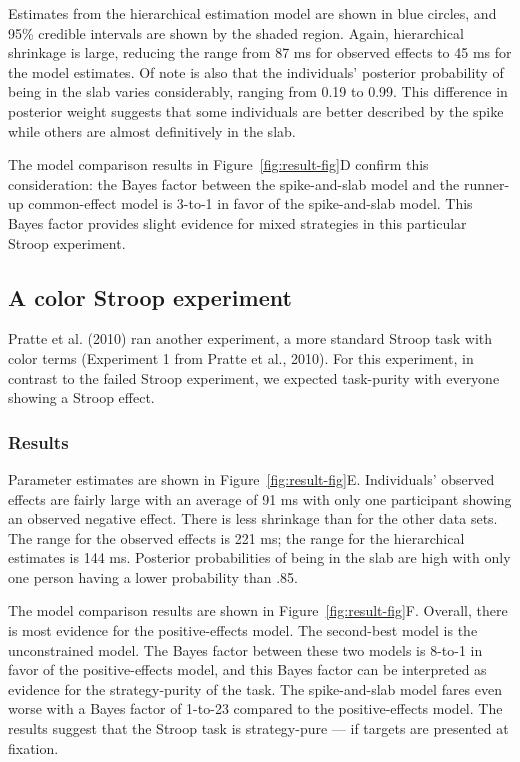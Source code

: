 \documentclass[english,man]{apa6}
\theoremstyle{definition}
\theoremstyle{definition}
\theoremstyle{remark}
\begin{document}
Estimates from the hierarchical estimation model are shown in blue
circles, and 95\% credible intervals are shown by the shaded region.
Again, hierarchical shrinkage is large, reducing the range from 87 ms
for observed effects to 45 ms for the model estimates. Of note is also
that the individuals' posterior probability of being in the slab varies
considerably, ranging from 0.19 to 0.99. This difference in posterior
weight suggests that some individuals are better described by the spike
while others are almost definitively in the slab.

The model comparison results in Figure~\ref{fig:result-fig}D confirm
this consideration: the Bayes factor between the spike-and-slab model
and the runner-up common-effect model is 3-to-1 in favor of the
spike-and-slab model. This Bayes factor provides slight evidence for
mixed strategies in this particular Stroop experiment.

\subsection{A color Stroop experiment}\label{a-color-stroop-experiment}

Pratte et al. (2010) ran another experiment, a more standard Stroop task
with color terms (Experiment 1 from Pratte et al., 2010). For this
experiment, in contrast to the failed Stroop experiment, we expected
task-purity with everyone showing a Stroop effect.

\subsubsection{Results}\label{results-2}

Parameter estimates are shown in Figure~\ref{fig:result-fig}E.
Individuals' observed effects are fairly large with an average of 91 ms
with only one participant showing an observed negative effect. There is
less shrinkage than for the other data sets. The range for the observed
effects is 221 ms; the range for the hierarchical estimates is 144 ms.
Posterior probabilities of being in the slab are high with only one
person having a lower probability than .85.

The model comparison results are shown in Figure~\ref{fig:result-fig}F.
Overall, there is most evidence for the positive-effects model. The
second-best model is the unconstrained model. The Bayes factor between
these two models is 8-to-1 in favor of the positive-effects model, and
this Bayes factor can be interpreted as evidence for the strategy-purity
of the task. The spike-and-slab model fares even worse with a Bayes
factor of 1-to-23 compared to the positive-effects model. The results
suggest that the Stroop task is strategy-pure --- if targets are
presented at fixation.
\end{document}
